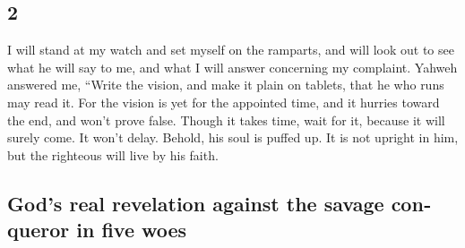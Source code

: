 \begin{paracol}{2}
\begin{otherlanguage}{english}
\hypertarget{section-3}{%
\section{2}\label{section-3}}

 I will stand at my watch and set myself on the ramparts,
and will look out to see what he will say to me, and what I will answer
concerning my complaint.  Yahweh answered me, ``Write the
vision, and make it plain on tablets, that he who runs may read it.
 For the vision is yet for the appointed time, and it
hurries toward the end, and won't prove false. Though it takes time,
wait for it, because it will surely come. It won't delay. 
Behold, his soul is puffed up. It is not upright in him, but the
righteous will live by his faith.

\hypertarget{gods-real-revelation-against-the-savage-conqueror-in-five-woes}{%
\subsection{God's real revelation against the savage conqueror in five
woes}\label{gods-real-revelation-against-the-savage-conqueror-in-five-woes}}


\end{otherlanguage}
\end{paracol}
